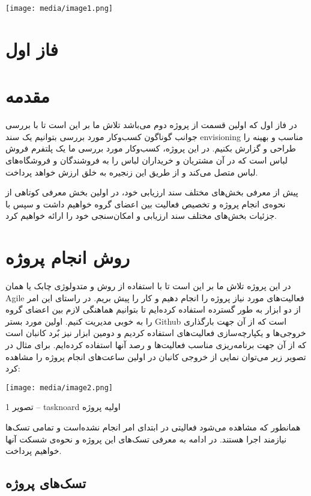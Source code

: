 \documentclass[]{article}
\date{}
\begin{document}
\texttt{[image: media/image1.png]}

\section{فاز اول}\label{ux641ux627ux632-ux627ux648ux644}

\section{مقدمه}\label{ux645ux642ux62fux645ux647}

در فاز اول که اولین قسمت از پروژه دوم می‌باشد تلاش ما بر این است تا با
بررسی جوانب گوناگون کسب‌وکار مورد بررسی بتوانیم یک سند envisioning مناسب
و بهینه را طراحی و گزارش بکنیم. در این پروژه، کسب‌وکار مورد بررسی ما یک
پلتفرم فروش لباس است که در آن مشتریان و خریداران لباس را به فروشندگان و
فروشگاه‌های لباس متصل می‌کند و از طریق این زنجیره به خلق ارزش خواهد
پرداخت.

پیش از معرفی بخش‌های مختلف سند ارزیابی خود، در اولین بخش معرفی کوتاهی از
نحوه‌ی انجام پروژه و تخصیص فعالیت بین اعضای گروه خواهیم داشت و سپس با
جزئیات بخش‌های مختلف سند ارزیابی و امکان‌سنجی خود را ارائه خواهیم کرد.

\section{روش انجام
پروژه}\label{ux631ux648ux634-ux627ux646ux62cux627ux645-ux67eux631ux648ux698ux647}

در این پروژه تلاش ما بر این است تا با استفاده از روش و متدولوژی چابک یا
همان Agile فعالیت‌های مورد نیاز پروژه را انجام دهیم و کار را پیش بریم.
در راستای این امر از دو ابزار به طور گسترده استفاده کرده‌ایم تا بتوانیم
هماهنگی لازم بین اعضای گروه را به خوبی مدیریت کنیم. اولین مورد بستر
Github است که از آن جهت بارگذاری خروجی‌ها و یکپارچه‌سازی فعالیت‌های
استفاده کردیم و دومین ابزار نیز بٌرد کانبان است که از آن جهت برنامه‌ریزی
مناسب فعالیت‌ها و رصد آنها استفاده کرده‌ایم. برای مثال در تصویر زیر
می‌توان نمایی از خروجی کانبان در اولین ساعت‌های انجام پروژه را مشاهده
کرد:

\texttt{[image: media/image2.png]}

تصویر 1 -- tasknoard اولیه پروژه

همانطور که مشاهده می‌شود فعالیتی در ابتدای امر انجام نشده‌است و تمامی
تسک‌ها نیازمند اجرا هستند. در ادامه به معرفی تسک‌های این پروژه و نحوه‌ی
شسکت‌ آنها خواهیم پرداخت.

\subsection{تسک‌های
پروژه}\label{ux62aux633ux6a9ux647ux627ux6cc-ux67eux631ux648ux698ux647}
\end{document}
